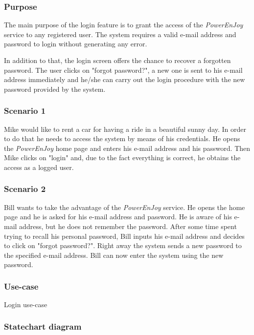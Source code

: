 \subsubsection{Purpose}
The main purpose of the login feature is to grant the access of the \emph{PowerEnJoy} service to any registered user. The system requires a valid e-mail address and password to login without generating any error.

In addition to that, the login screen offers the chance to recover a forgotten password. The user clicks on "forgot password?", a new one is sent to his e-mail address immediately and he/she can carry out the login procedure with the new password provided by the system.

\subsubsection{Scenario 1}
Mike would like to rent a car for having a ride in a beautiful sunny day. In order to do that he needs to access the system by means of his credentials. He opens the \emph{PowerEnJoy} home page and enters his e-mail address and his password. Then Mike clicks on "login" and, due to the fact everything is correct, he obtains the access as a logged user.

\subsubsection{Scenario 2}
Bill wants to take the advantage of the \emph{PowerEnJoy} service. He opens the home page and he is asked for his e-mail address and password. He is aware of his e-mail address, but he does not remember the password. After some time spent trying to recall his personal password, Bill inputs his e-mail address and decides to click on "forgot password?". Right away the system sends a new password to the specified e-mail address. Bill can now enter the system using the new password.

\subsubsection{Use-case}
\begin{table}

\caption{Login use-case}
\label{login_uc}
\end{table}

\subsubsection{Statechart diagram}


